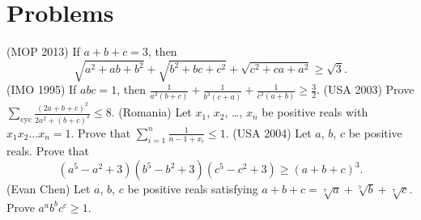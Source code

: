 \documentclass[11pt]{scrartcl}
\begin{document}
\section{Problems}
\begin{enumerate}
  \ii (MOP 2013) If $a+b+c=3$, then \[ \sqrt{a^2+ab+b^2}+\sqrt{b^2+bc+c^2}+\sqrt{c^2+ca+a^2} \ge \sqrt 3. \]
  \ii (IMO 1995) If $abc=1$, then $\frac{1}{a^3(b+c)}+\frac{1}{b^3(c+a)}+\frac{1}{c^3(a+b)}\ge\frac{3}{2}$.
  \ii (USA 2003) Prove $\sum_{\text{cyc}} \frac{(2a+b+c)^2}{2a^2+(b+c)^2} \le 8$.
  \ii (Romania) Let $x_1$, $x_2$, \dots, $x_n$ be positive reals with $x_1x_2 \dots x_n=1$. Prove that $\sum_{i=1}^n \frac{1}{n-1+x_i} \le 1$.
  \ii (USA 2004) Let $a$, $b$, $c$ be positive reals. Prove that
  \[ \left( a^5-a^2+3 \right)\left( b^5-b^2+3 \right)\left( c^5-c^2+3 \right) \ge \left( a+b+c \right)^3. \]
  \ii (Evan Chen) Let $a$, $b$, $c$ be positive reals satisfying $a+b+c = \sqrt[7]{a} + \sqrt[7]{b} + \sqrt[7]{c}$. Prove $a^a b^b c^c \ge 1$.
\end{enumerate}
\end{document}
